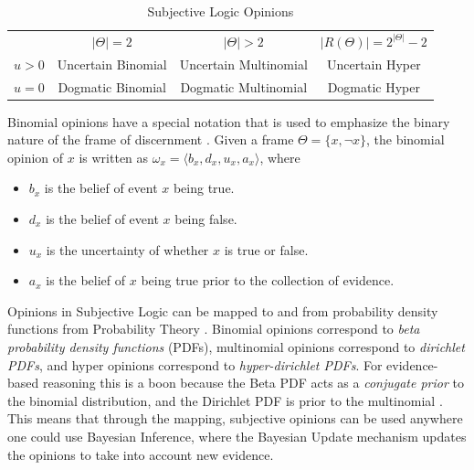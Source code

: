 \documentclass[thesis.tex]{subfiles}
\begin{document}
\begin{table}
  \begin{center}
    \begin{tabular}{ r|c|c|c| }
      \multicolumn{1}{r}{}
      &  \multicolumn{1}{c}{$|\Theta| = 2$}
      &  \multicolumn{1}{c}{$|\Theta| > 2$}
      &  \multicolumn{1}{c}{$|R(\Theta)| = 2^{|\Theta|} - 2$} \\
      \cline{2-4}
      $u > 0$ & Uncertain Binomial & Uncertain Multinomial & Uncertain Hyper \\
      \cline{2-4}
      $u = 0$ & Dogmatic Binomial & Dogmatic Multinomial & Dogmatic Hyper \\
      \cline{2-4}
    \end{tabular}
  \end{center}

  \caption{Subjective Logic Opinions}
  \label{tbl:sl-opinions}
\end{table}

Binomial opinions have a special notation that is used to emphasize the binary nature of the frame of
discernment \cite{josang2001logic}. Given a frame $\Theta = \lbrace x, \lnot x \rbrace$, the binomial opinion of $x$ is written
as $\omega_x = \langle b_x, d_x, u_x, a_x \rangle$, where

\begin{itemize}
  \item $b_x$ is the belief of event $x$ being true.
  \item $d_x$ is the belief of event $x$ being false.
  \item $u_x$ is the uncertainty of whether $x$ is true or false.
  \item $a_x$ is the belief of $x$ being true prior to the collection of evidence.
\end{itemize}

Opinions in Subjective Logic can be mapped to and from probability density functions from Probability
Theory \cite{josang2001logic, josang2012interpretation}. Binomial opinions correspond to \emph{beta probability density functions} (PDFs),
multinomial opinions correspond to \emph{dirichlet PDFs}, and hyper opinions correspond
to \emph{hyper-dirichlet PDFs}. For evidence-based reasoning this is a boon because the
Beta PDF acts as a \emph{conjugate prior} to the binomial distribution, and
the Dirichlet PDF is prior to the multinomial \cite{schlaifer1961applied}. This means that through the mapping,
subjective opinions can be used anywhere one could use Bayesian Inference, where the Bayesian Update
mechanism updates the opinions to take into account new evidence.
\end{document}
